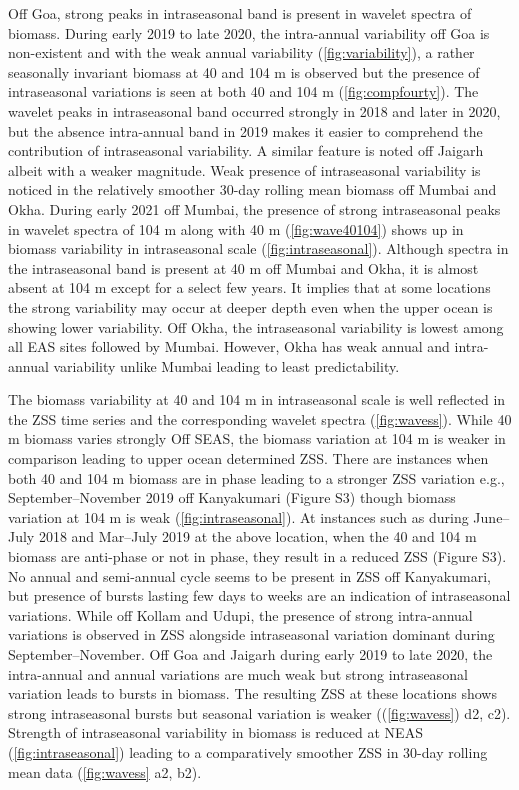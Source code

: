 \documentclass[authoryear,review,12pt]{elsarticle}
\begin{document}
	Off Goa, strong peaks in intraseasonal band is present in wavelet spectra of biomass. During early 2019 to late 2020, the intra-annual variability off Goa is non-existent and with the weak annual variability (\cref{fig:variability}), a rather seasonally invariant biomass at 40 and 104 m is observed but the presence of intraseasonal variations is seen at both 40 and 104 m (\cref{fig:compfourty}). The wavelet peaks in intraseasonal band occurred strongly in 2018 and later in 2020, but the absence intra-annual band in 2019 makes it easier to comprehend the contribution of intraseasonal variability. A similar feature is noted off Jaigarh albeit with a weaker magnitude. 
	Weak presence of intraseasonal variability is noticed in the relatively smoother 30-day rolling mean biomass off Mumbai and Okha. During early 2021 off Mumbai, the presence of strong intraseasonal peaks in wavelet spectra of 104 m along with 40 m (\cref{fig:wave40104}) shows up in biomass variability in intraseasonal scale (\cref{fig:intraseasonal}). Although spectra in the intraseasonal band is present at 40 m off Mumbai and Okha, it is almost absent at 104 m  except for a select few years.  It implies that at some locations the strong variability may occur at deeper depth even when the upper ocean is showing lower variability. Off Okha, the intraseasonal variability is lowest among all EAS sites followed by Mumbai. However, Okha has weak annual and intra-annual variability unlike Mumbai leading to least predictability.
	
	The biomass variability at 40 and 104 m in intraseasonal scale is well reflected in the ZSS time series and the corresponding wavelet spectra (\cref{fig:wavess}). While 40 m biomass varies strongly Off SEAS, the biomass variation at 104 m is weaker in comparison leading to upper ocean determined ZSS. There are instances when both 40 and 104 m biomass are in phase leading to a stronger ZSS variation e.g., September--November 2019 off Kanyakumari (Figure S3) though biomass variation at 104 m is weak (\cref{fig:intraseasonal}). At instances such as during June--July 2018 and Mar--July 2019 at the above location, when the 40 and 104 m biomass are anti-phase or not in phase, they result in a reduced ZSS (Figure S3). No annual and semi-annual cycle seems to be present in ZSS off Kanyakumari, but presence of bursts lasting few days to weeks are an indication of intraseasonal variations. While off Kollam and Udupi, the presence of strong intra-annual variations is observed in ZSS alongside intraseasonal variation dominant during September--November. Off Goa and Jaigarh during early 2019 to late 2020, the intra-annual and annual variations are much weak but strong intraseasonal variation leads to bursts in biomass. The resulting ZSS at these locations shows strong intraseasonal bursts but seasonal variation is weaker ((\cref{fig:wavess}) d2, c2). Strength of intraseasonal variability in biomass is reduced at NEAS (\cref{fig:intraseasonal}) leading to a comparatively smoother ZSS in 30-day rolling mean data (\cref{fig:wavess} a2, b2). 
	
\end{document}
